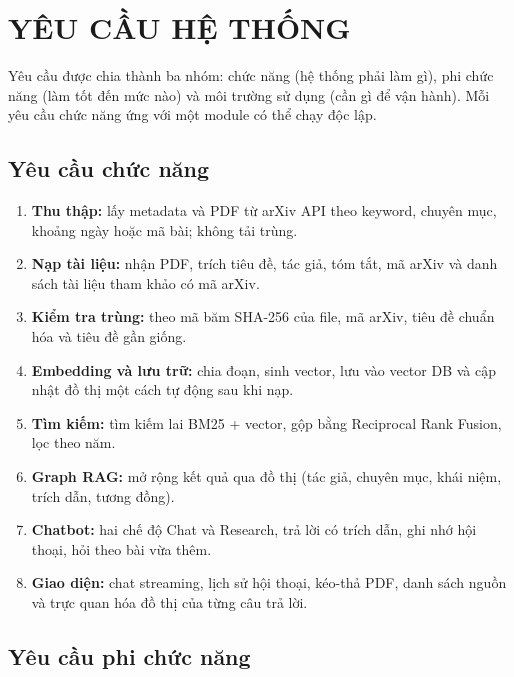 \chapter{YÊU CẦU HỆ THỐNG}\label{chap:yeucau}

Yêu cầu được chia thành ba nhóm: chức năng (hệ thống phải làm gì), phi chức năng (làm tốt đến mức nào) và môi
trường sử dụng (cần gì để vận hành). Mỗi yêu cầu chức năng ứng với một module có thể chạy độc lập.

\section{Yêu cầu chức năng}

\begin{enumerate}[label=\textbf{FR\arabic*.}, leftmargin=3.2em]
\item \textbf{Thu thập:} lấy metadata và PDF từ arXiv API theo keyword, chuyên mục, khoảng ngày hoặc mã bài;
  không tải trùng.
\item \textbf{Nạp tài liệu:} nhận PDF, trích tiêu đề, tác giả, tóm tắt, mã arXiv và danh sách tài liệu tham khảo
  có mã arXiv.
\item \textbf{Kiểm tra trùng:} theo mã băm SHA-256 của file, mã arXiv, tiêu đề chuẩn hóa và tiêu đề gần giống.
\item \textbf{Embedding và lưu trữ:} chia đoạn, sinh vector, lưu vào vector DB và cập nhật đồ thị một cách tự
  động sau khi nạp.
\item \textbf{Tìm kiếm:} tìm kiếm lai BM25 + vector, gộp bằng Reciprocal Rank Fusion, lọc theo năm.
\item \textbf{Graph RAG:} mở rộng kết quả qua đồ thị (tác giả, chuyên mục, khái niệm, trích dẫn, tương đồng).
\item \textbf{Chatbot:} hai chế độ Chat và Research, trả lời có trích dẫn, ghi nhớ hội thoại, hỏi theo bài vừa
  thêm.
\item \textbf{Giao diện:} chat streaming, lịch sử hội thoại, kéo-thả PDF, danh sách nguồn và trực quan hóa đồ thị
  của từng câu trả lời.
\end{enumerate}

\section{Yêu cầu phi chức năng}

